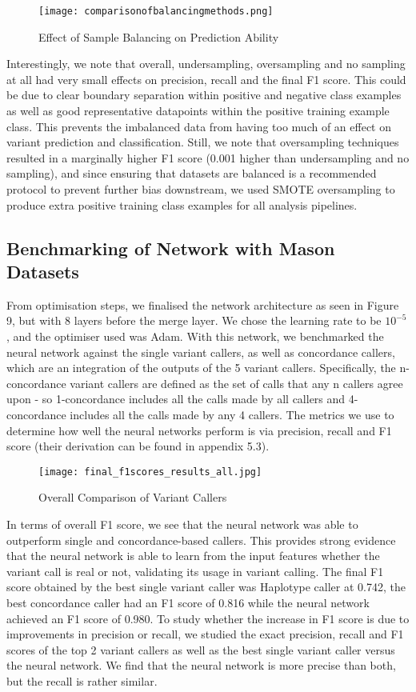 \documentclass{article}
\begin{document}
\begin{figure}[H]
\centering
\texttt{[image: comparisonofbalancingmethods.png]}
\caption{Effect of Sample Balancing on Prediction Ability                 }
\end{figure}

Interestingly, we note that overall, undersampling, oversampling and no sampling at all had very small effects on precision, recall and the final F1 score. This could be due to clear boundary separation within positive and negative class examples as well as good representative datapoints within the positive training example class. This prevents the imbalanced data from having too much of an effect on variant prediction and classification. Still, we note that oversampling techniques resulted in a marginally higher F1 score (0.001 higher than undersampling and no sampling), and since ensuring that datasets are balanced is a recommended protocol to prevent further bias downstream, we used SMOTE oversampling to produce extra positive training class examples for all analysis pipelines.


\subsection{Benchmarking of Network with Mason Datasets}
From optimisation steps, we finalised the network architecture as seen in Figure 9, but with 8 layers before the merge layer. We chose the learning rate to be $10^{-5}$, and the optimiser used was Adam. With this network, we benchmarked the neural network against the single variant callers, as well as concordance callers, which are an integration of the outputs of the 5 variant callers. Specifically, the n-concordance variant callers are defined as the set of calls that any n callers agree upon - so 1-concordance includes all the calls made by all callers and 4-concordance includes all the calls made by any 4 callers. The metrics we use to determine how well the neural networks perform is via precision, recall and F1 score (their derivation can be found in appendix 5.3). 

\begin{figure}[H]
\texttt{[image: final\_f1scores\_results\_all.jpg]}
\caption{Overall Comparison of Variant Callers}
\centering
\end{figure}

In terms of overall F1 score, we see that the neural network was able to outperform single and concordance-based callers. This provides strong evidence that the neural network is able to learn from the input features whether the variant call is real or not, validating its usage in variant calling. The final F1 score obtained by the best single variant caller was Haplotype caller at 0.742, the best concordance caller had an F1 score of 0.816 while the neural network achieved an F1 score of 0.980. To study whether the increase in F1 score is due to improvements in precision or recall, we studied the exact precision, recall and F1 scores of the top 2 variant callers as well as the best single variant caller versus the neural network. We find that the neural network is more precise than both, but the recall is rather similar. 
\end{document}
